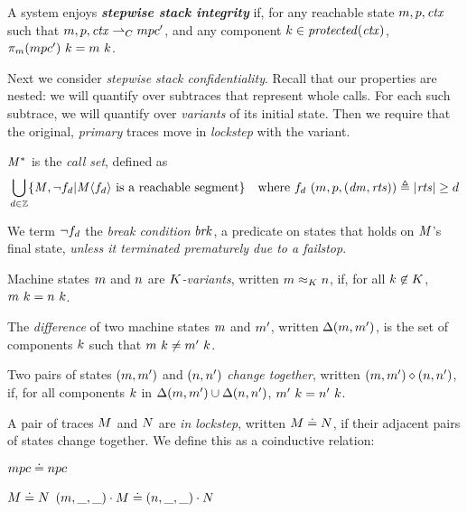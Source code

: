 \documentclass[acmsmall,review,anonymous]{acmart}\settopmatter{printfolios=true,printccs=false,printacmref=false}
\begin{document}
{
A system enjoys \textit{\textbf{stepwise stack integrity}} if, for any reachable state
\(m,p,\mathit{ctx}\) such that \(m,p,\mathit{ctx} \overset{}{\rightharpoonup}_C mpc'\),
and any component \(k \in \mathit{protected}(\mathit{ctx})\),
\(\pi_m(mpc') ~ k = m ~ k\).

Next we consider {\em stepwise stack confidentiality}. Recall that our properties are
nested: we will quantify over subtraces that represent whole calls. For each such
subtrace, we will quantify over {\em variants} of its initial state. Then we require
that the original, {\em primary} traces move in {\em lockstep} with the variant.

 \(\mathit{M}^*\) is the \emph{call set}, defined as
\[\begin{aligned}
\bigcup_{d \in \mathbb{Z}} \{\mathit{M}, \neg f_d | \mathit{M}\langle f_d \rangle
\text{ is a reachable segment}\} \hspace{1em} &
\text{where } f_d ~ (m,p,(\mathit{dm},\mathit{rts})) \triangleq |\mathit{rts}| \geq d \\
\end{aligned}\]

We term \(\neg f_d\) the {\em break condition} \(\mathit{brk}\), a predicate on
states that holds on \(\mathit{M}\)'s final state, {\em unless it terminated prematurely due to a failstop}.

 Machine states \(m\) and \(n\) are {\em \(K\)-variants},
written \(m \approx_K n\), if, for
all \(k \not \in K\), \(m ~ k = n ~ k\).

 The \emph{difference} of two machine states \(m\) and \(m'\), written \(\Delta(m,m')\),
is the set of components \(k\)
such that \(m ~ k \not = m' ~ k\).

 Two pairs of states \((m,m')\) and \((n,n')\)
 {\em change together}, written \((m,m') \diamond (n,n')\), if, for all components \(k\) in
\(\Delta(m,m') \cup \Delta(n,n')\),
\(m' ~ k = n' ~ k\).

 A pair of traces \(M\) and \(N\) are {\em in lockstep},
written \(M \doteq N\),
if their adjacent pairs of states change together.  We define this as a coinductive relation:

\begin{minipage}{.3\textwidth}
\judgment{}
         {\(mpc \doteq npc\)}
\end{minipage}
\begin{minipage}{.6\textwidth}
\judgmenttwo{\(\mach, \pi_\mach(\head(\machT)) \diamond \nach, \pi_\mach(\head(\nachT))\)}
            {\(M \doteq N\)}
            {\((m,\mbox{\_},\mbox{\_}) \cdot M \doteq (n,\mbox{\_},\mbox{\_}) \cdot N\)}
\end{minipage}

}
\end{document}

